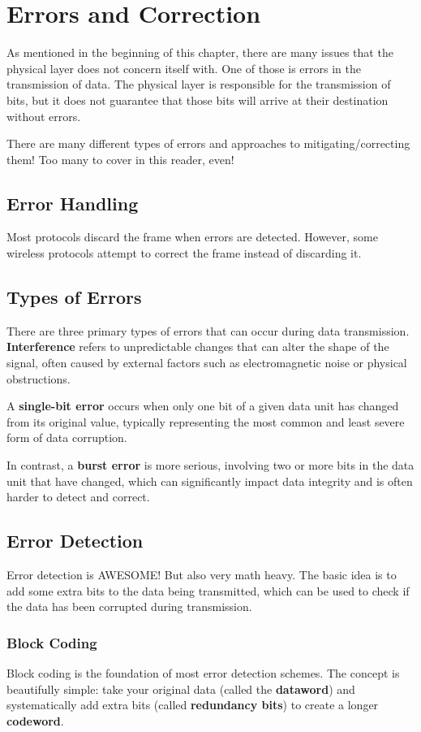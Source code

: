 \section{Errors and Correction}
\label{sec:error_detection}
As mentioned in the beginning of this chapter, there are many issues that the physical layer does not concern itself with. One of those is errors in the transmission of data. The physical layer is responsible for the transmission of bits, but it does not guarantee that those bits will arrive at their destination without errors.

There are many different types of errors and approaches to mitigating/correcting them! Too many to cover in this reader, even!

\subsection{Error Handling}
Most protocols discard the frame when errors are detected. However, some wireless protocols attempt to correct the frame instead of discarding it.

\subsection{Types of Errors}
There are three primary types of errors that can occur during data transmission. \textbf{Interference} refers to unpredictable changes that can alter the shape of the signal, often caused by external factors such as electromagnetic noise or physical obstructions. 

A \textbf{single-bit error} occurs when only one bit of a given data unit has changed from its original value, typically representing the most common and least severe form of data corruption. 

In contrast, a \textbf{burst error} is more serious, involving two or more bits in the data unit that have changed, which can significantly impact data integrity and is often harder to detect and correct.

\subsection{Error Detection}
Error detection is AWESOME! But also very math heavy. The basic idea is to add some extra bits to the data being transmitted, which can be used to check if the data has been corrupted during transmission.

\subsubsection{Block Coding}
Block coding is the foundation of most error detection schemes. The concept is beautifully simple: take your original data (called the \textbf{dataword}) and systematically add extra bits (called \textbf{redundancy bits}) to create a longer \textbf{codeword}.

